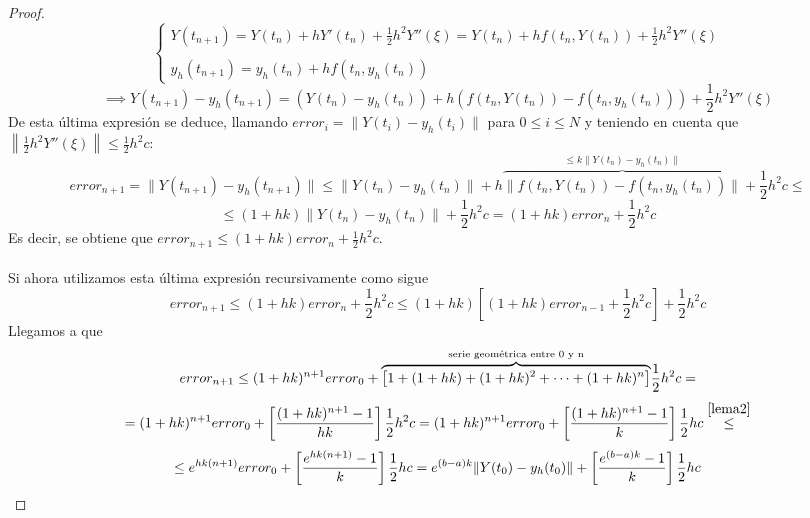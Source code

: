 \begin{proof}
    \begin{equation}
\label{eq1}
\left\{
\begin{array}{l}
Y(t_{n+1}) = Y(t_n) + hY'(t_n) + \frac{1}{2}h^2Y''(\xi) = Y(t_n) + hf(t_n, Y(t_n)) + \frac{1}{2}h^2Y''(\xi)\\
\\
y_h(t_{n+1}) = y_h(t_n) + hf(t_n, y_h(t_n))
\end{array}
\right. 
\end{equation}
\begin{equation}
\label{eq2}
\implies Y(t_{n+1}) - y_h(t_{n+1}) = (Y(t_n) - y_h(t_n)) + h(f(t_n, Y(t_n)) - f(t_n, y_h(t_n))) + \frac{1}{2}h^2Y''(\xi)
\end{equation}
De esta última expresión se deduce, llamando $error_i = \|Y(t_i) - y_h(t_i)\|$ para $0\le i \le N$ y teniendo en cuenta que $\left\|\frac{1}{2}h^2Y''(\xi)\right\| \le \frac{1}{2}h^2c$:
$$
error_{n+1} = \|Y(t_{n+1}) - y_h(t_{n+1})\| \le \|Y(t_n) - y_h(t_n)\| + h\overset{\le k\| Y(t_n) - y_h(t_n)\|}{\overbrace{\|f(t_n, Y(t_n)) - f(t_n, y_h(t_n))\|}}  + \frac{1}{2}h^2c \le
$$
$$
\le (1+hk)\|Y(t_n) - y_h(t_n)\| + \frac{1}{2}h^2c = (1+hk)error_n + \frac{1}{2}h^2c
$$
Es decir, se obtiene que $error_{n+1} \le (1+hk)error_n + \frac{1}{2}h^2c$.\\\\Si ahora utilizamos esta última expresión recursivamente como sigue
$$
error_{n+1} \le (1+hk)error_n + \frac{1}{2}h^2c \le (1+hk)\left[(1+hk)error_{n-1} + \frac{1}{2}h^2c\right] + \frac{1}{2}h^2c
$$
Llegamos a que
$$
error_{n+1} \le (1+hk)^{n+1}error_0 + \overset{\textnormal{serie geométrica entre 0 y n}}{\overbrace{\left[ 1 + (1+hk) + (1+hk)^2 + \cdots + (1+hk)^{n}\right]}}\frac{1}{2}h^2c =  
$$
$$
= (1+hk)^{n+1}error_0 + \left[\frac{(1+hk)^{n+1} - 1}{hk}\right]\frac{1}{2}h^2c = (1+hk)^{n+1}error_0 + \left[\frac{(1+hk)^{n+1} - 1}{k}\right]\frac{1}{2}hc \overset{\ref{lema2}}{\le} 
$$
$$
\le e^{hk(n+1)}error_0 + \left[\frac{e^{hk(n+1)} - 1}{k}\right]\frac{1}{2}hc =  e^{(b-a)k}\|Y(t_0) - y_h(t_0)\| + \left[\frac{e^{(b-a)k} - 1}{k}\right]\frac{1}{2}hc \qedhere
$$
\end{proof}

